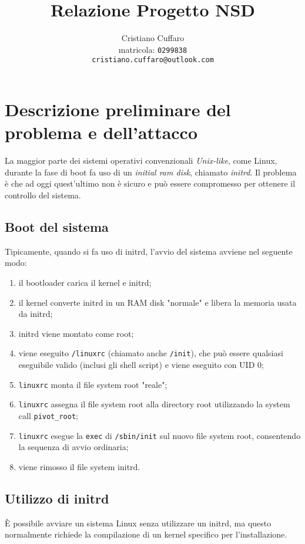 \documentclass{article}
\begin{document}
\author{%
Cristiano Cuffaro \\
{\small matricola: \texttt{0299838}} \\
{\small \texttt{cristiano.cuffaro@outlook.com}}
}
\title{Relazione Progetto NSD}

\maketitle
\tableofcontents
\newpage

\section{Descrizione preliminare del problema e dell'attacco}
La maggior parte dei sistemi operativi convenzionali \textsl{Unix-like}, come Linux, durante la fase di boot fa uso di un \textsl{initial ram disk}, chiamato \textsl{initrd}. Il problema è che ad oggi quest'ultimo non è sicuro e può essere compromesso per ottenere il controllo del sistema.

\subsection{Boot del sistema}
Tipicamente, quando si fa uso di initrd, l'avvio del sistema avviene nel seguente modo:
\begin{enumerate}
	\item il bootloader carica il kernel e initrd;
	\item il kernel converte initrd in un RAM disk "normale" e libera la memoria usata da initrd;
	\item initrd viene montato come root;
	\item viene eseguito \texttt{/linuxrc} (chiamato anche \texttt{/init}), che può essere qualsiasi eseguibile valido (inclusi gli shell script) e viene eseguito con UID 0;
	\item \texttt{linuxrc} monta il file system root "reale";
	\item \texttt{linuxrc} assegna il file system root alla directory root utilizzando la system call \texttt{pivot\_root};
	\item \texttt{linuxrc} esegue la \texttt{exec} di \texttt{/sbin/init} sul nuovo file system root, consentendo la sequenza di avvio ordinaria;
	\item viene rimosso il file system initrd.
\end{enumerate}

\subsection{Utilizzo di initrd}
È possibile avviare un sistema Linux senza utilizzare un initrd, ma questo normalmente richiede la compilazione di un kernel specifico per l'installazione.
\end{document}

